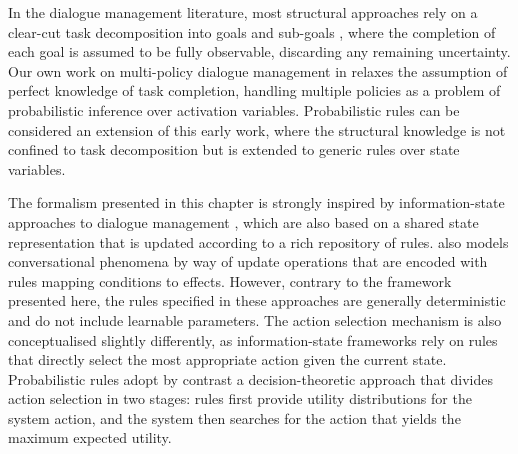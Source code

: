 In the dialogue management literature, most structural approaches rely on a clear-cut task decomposition into goals and sub-goals \citep{Allen:2000:AGD:973935.973937,Steedman-Petrick:07,Bohus:2009:RDM:1518321.1518367}, where the completion of each goal is assumed to be fully observable, discarding any remaining uncertainty.  Our own work on multi-policy dialogue management in \cite{multipolicy-sigdial2011} relaxes the assumption of perfect knowledge of task completion, handling multiple policies as a problem of probabilistic inference over activation variables.  Probabilistic rules can be considered an extension of this early work, where the structural knowledge is not confined to task decomposition but is extended to generic rules over state variables.  

The formalism presented in this chapter is strongly inspired by information-state approaches to dialogue management \citep{Larsson:2000,Bos2003}, which are also based on a shared state representation that is updated according to a rich repository of rules.  \cite{Ginzburg2012} also models conversational phenomena by way of update operations that are encoded with rules mapping conditions to effects. However, contrary to the framework presented here, the rules specified in these approaches are generally deterministic and do not include learnable parameters. The action selection mechanism is also conceptualised slightly differently, as information-state frameworks rely on rules that directly select the most appropriate action given the current state. Probabilistic rules adopt by contrast a decision-theoretic approach that divides action selection in two stages: rules first provide utility distributions for the system action, and the system then searches for the action that yields the maximum expected utility. 

